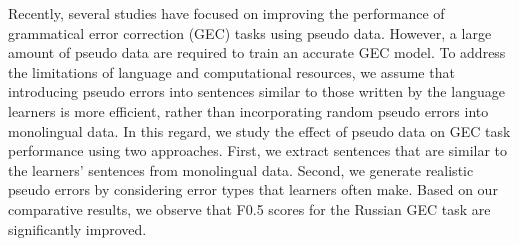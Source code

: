 Recently, several studies have focused on improving the performance of grammatical error correction (GEC) tasks using pseudo data. However, a large amount of pseudo data are required to train an accurate GEC model. To address the limitations of language and computational resources, we assume that introducing pseudo errors into sentences similar to those written by the language learners is more efficient, rather than incorporating random pseudo errors into monolingual data. In this regard, we study the effect of pseudo data on GEC task performance using two approaches. First, we extract sentences that are similar to the learners' sentences from monolingual data. Second, we generate realistic pseudo errors by considering error types that learners often make. Based on our comparative results, we observe that F0.5 scores for the Russian GEC task are significantly improved.
